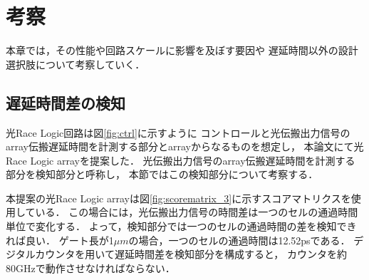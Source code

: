 \chapter{考察}
本章では，その性能や回路スケールに影響を及ぼす要因や
遅延時間以外の設計選択肢について考察していく．
\section{遅延時間差の検知}
光Race Logic回路は図\ref{fig:ctrl}に示すように
コントロールと光伝搬出力信号のarray伝搬遅延時間を計測する部分とarrayからなるものを想定し，
本論文にて光Race Logic arrayを提案した．
光伝搬出力信号のarray伝搬遅延時間を計測する部分を検知部分と呼称し，
本節ではこの検知部分について考察する．

本提案の光Race Logic arrayは図\ref{fig:scorematrix_3}に示すスコアマトリクスを使用している．
この場合には，光伝搬出力信号の時間差は一つのセルの通過時間単位で変化する．
よって，検知部分では一つのセルの通過時間の差を検知できれば良い．
ゲート長が1$\mu m$の場合，一つのセルの通過時間は12.52psである．
デジタルカウンタを用いて遅延時間差を検知部分を構成すると，
カウンタを約80GHzで動作させなければならない．

